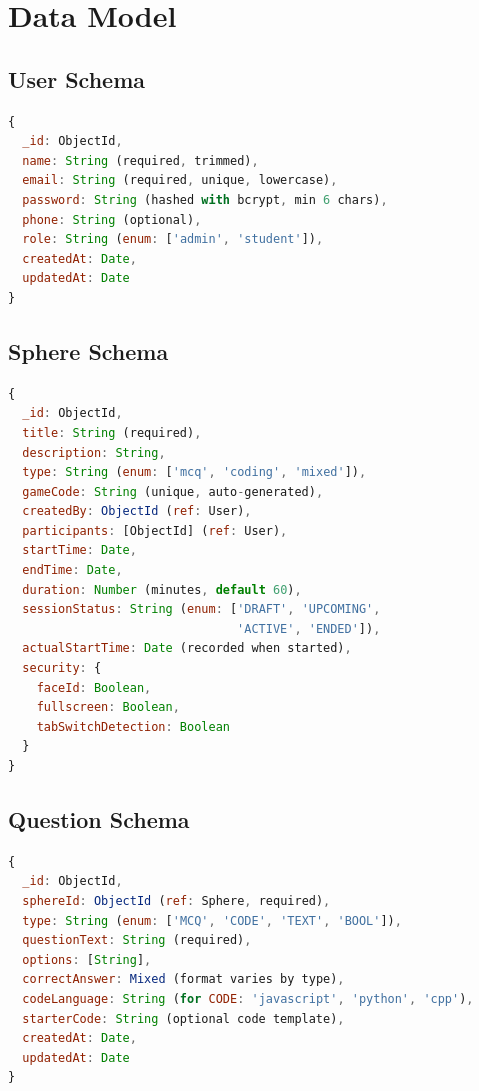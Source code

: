 \documentclass[12pt,a4paper]{report}
\begin{document}
\section{Data Model}

\subsection{User Schema}

\begin{lstlisting}[language=JavaScript]
{
  _id: ObjectId,
  name: String (required, trimmed),
  email: String (required, unique, lowercase),
  password: String (hashed with bcrypt, min 6 chars),
  phone: String (optional),
  role: String (enum: ['admin', 'student']),
  createdAt: Date,
  updatedAt: Date
}
\end{lstlisting}

\subsection{Sphere Schema}

\begin{lstlisting}[language=JavaScript]
{
  _id: ObjectId,
  title: String (required),
  description: String,
  type: String (enum: ['mcq', 'coding', 'mixed']),
  gameCode: String (unique, auto-generated),
  createdBy: ObjectId (ref: User),
  participants: [ObjectId] (ref: User),
  startTime: Date,
  endTime: Date,
  duration: Number (minutes, default 60),
  sessionStatus: String (enum: ['DRAFT', 'UPCOMING', 
                                'ACTIVE', 'ENDED']),
  actualStartTime: Date (recorded when started),
  security: {
    faceId: Boolean,
    fullscreen: Boolean,
    tabSwitchDetection: Boolean
  }
}
\end{lstlisting}

\subsection{Question Schema}

\begin{lstlisting}[language=JavaScript]
{
  _id: ObjectId,
  sphereId: ObjectId (ref: Sphere, required),
  type: String (enum: ['MCQ', 'CODE', 'TEXT', 'BOOL']),
  questionText: String (required),
  options: [String],
  correctAnswer: Mixed (format varies by type),
  codeLanguage: String (for CODE: 'javascript', 'python', 'cpp'),
  starterCode: String (optional code template),
  createdAt: Date,
  updatedAt: Date
}
\end{lstlisting}
\end{document}
